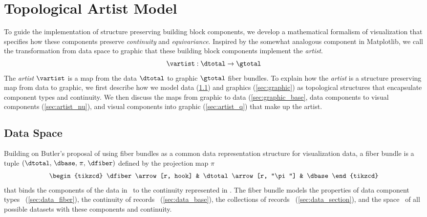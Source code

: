 \documentclass[../main.tex]{subfiles}
\begin{document}
\section{Topological Artist Model}
\label{sec:tam}
To guide the implementation of structure preserving building block components, we develop a mathematical formalism of visualization that specifies how these components preserve \textit{continuity} and \textit{equivariance}. Inspired by the somewhat analogous component in Matplotlib\cite{hunterArchitectureOpenSource}, we call the transformation from data space to graphic that these building block components implement the \textit{artist}.
\begin{equation}
    \label{eq:artist}
    \mathscr{\vartist}: \mathscr{\dtotal} \rightarrow \mathscr{\gtotal}
\end{equation}
The \textit{artist} $\mathscr{\vartist}$ is a map from the data $\mathscr{\dtotal}$ to graphic $\mathscr{\gtotal}$ fiber bundles. To explain how the \textit{artist} is a structure preserving map from data to graphic, we first describe how we model data (\ref{sec:data}) and graphics (\ref{sec:graphic}) as topological structures that encapsulate component types and continuity. We then discuss the maps from graphic to data (\ref{sec:graphic_base}, data components to visual components (\ref{sec:artist_nu}), and visual components into graphic (\ref{sec:artist_q}) that make up the artist.

\subsection{Data Space \dtotal}
\label{sec:data}
Building on Butler's proposal of using fiber bundles as a common data representation structure for visualization data\cite{butlerVectorBundleClassesForm1992, butlerVisualizationModelBased1989}, a fiber bundle is a tuple $(\dtotal,\,\dbase,\,\pi ,\,\dfiber)$ defined by the projection map $\pi$
\begin{equation}
    \label{eq:fiber_bundle}
    \begin{tikzcd}
        \dfiber \arrow[r, hook] & \dtotal \arrow[r, "\pi"] & \dbase
    \end{tikzcd}
\end{equation}
that binds the components of the data in \dfiber\ to the continuity represented in \dbase. The fiber bundle models the properties of data component types \dfiber\ (\ref{sec:data_fiber}), the continuity of records \dbase\ (\ref{sec:data_base}), the collections of records \dsection\ (\ref{sec:data_section}), and the space \dtotal\ of all possible datasets with these components and continuity. 
\end{document}
